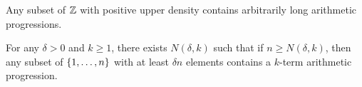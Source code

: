 \documentclass[reqno, twoside]{article}
\begin{document}
\begin{exercise}
\begin{center}
\begin{minipage}{0.95\textwidth}
\begin{theorem*}
                    Any subset of $\mathbb{Z}$ with positive upper density contains arbitrarily long arithmetic progressions.
                \end{theorem*}
                \begin{theorem*}
                    For any $\delta>0$ and $k\geq1$, there exists $N(\delta,k)$ such that if $n\geq N(\delta,k)$, then any subset of $\left\{1,\dots,n\right\}$ with at least $\delta n$ elements contains a $k$-term arithmetic progression.
                \end{theorem*}
            \end{minipage}
        \end{center}       
    \end{exercise}
\end{document}
